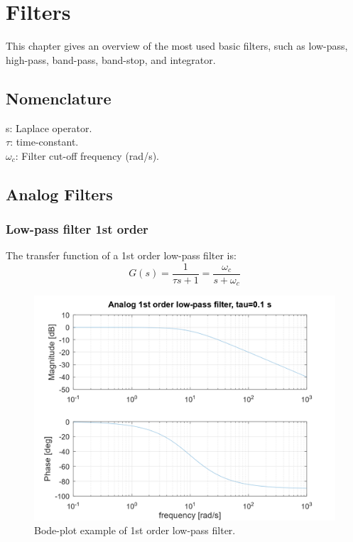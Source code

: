 \documentclass[]{book}
\begin{document}
\hypertarget{filters}{%
\chapter{Filters}\label{filters}}

This chapter gives an overview of the most used basic filters, such as low-pass, high-pass, band-pass, band-stop, and integrator.

\hypertarget{nomenclature}{%
\section{Nomenclature}\label{nomenclature}}

s: Laplace operator.\\
\(\tau\): time-constant.\\
\(\omega_c\): Filter cut-off frequency (rad/s).

\hypertarget{analog-filters}{%
\section{Analog Filters}\label{analog-filters}}

\hypertarget{low-pass-filter-1st-order}{%
\subsection{Low-pass filter 1st order}\label{low-pass-filter-1st-order}}

The transfer function of a 1st order low-pass filter is:
\[
G(s) =  \frac{1}{\tau s + 1} = \frac{\omega_c}{s + \omega_c}
\label{eq:lpf1}
\]

\begin{figure}
\includegraphics[width=1\linewidth]{images/filters/lpf_1st} \caption{Bode-plot example of 1st order low-pass filter.}\label{fig:unnamed-chunk-1}
\end{figure}
\end{document}
